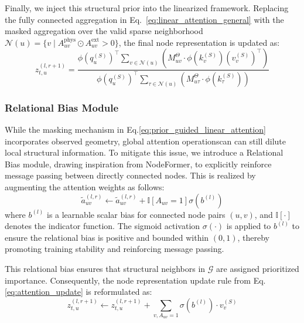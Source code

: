 \documentclass[5p,times,authoryear]{elsarticle}
\begin{document}
Finally, we inject this structural prior into the linearized framework. Replacing the fully connected aggregation in Eq.~\eqref{eq:linear_attention_general} with the masked aggregation over the valid sparse neighborhood $\mathcal{N}(u) = \{v \mid A^{\text{phys}}_{uv} \odot A^{\text{ext}}_{uv} > 0\}$, the final node representation is updated as:
\vspace{-3pt}
\begin{equation}
\label{eq:prior_guided_linear_attention}
z_{t,u}^{(l, r+1)} = \frac{\phi(q_u^{(S)})^\top \sum_{v \in \mathcal{N}(u)} \left( M_{uv}^{\Theta} \cdot \phi(k_v^{(S)}) (v_v^{(S)})^\top \right)}{\phi(q_u^{(S)})^\top \sum_{\tau \in \mathcal{N}(u)} \left( M_{u\tau}^{\Theta} \cdot \phi(k_\tau^{(S)}) \right)}
\end{equation}

\subsubsection{Relational Bias Module}
While the masking mechanism in Eq.\eqref{eq:prior_guided_linear_attention} incorporates observed geometry, global attention operationscan can still dilute local structural information. To mitigate this issue, we introduce a Relational Bias module, drawing inspiration from NodeFormer\citep{wu2023nodeformer}, to explicitly reinforce message passing between directly connected nodes. This is realized by augmenting the attention weights as follows:
\begin{equation}
\label{eq:relational_bias_attention}
\tilde{a}_{uv}^{(l,r)} \leftarrow \tilde{a}_{uv}^{(l,r)} + \mathbb{I}[A_{uv}=1]\sigma(b^{(l)})
\end{equation}
where $b^{(l)}$ is a learnable scalar bias for connected node pairs $(u,v)$, and $\mathbb{I}[\cdot]$ denotes the indicator function. The sigmoid activation $\sigma(\cdot)$ is applied to $b^{(l)}$ to ensure the relational bias is positive and bounded within $(0, 1)$, thereby promoting training stability and reinforcing message passing.

This relational bias ensures that structural neighbors in $\mathcal{G}$ are assigned prioritized importance. Consequently, the node representation update rule from Eq.\eqref{eq:attention_update} is reformulated as:
\vspace{-3pt}
\begin{equation}
\label{eq:relational_bias_update}
z_{t,u}^{(l, r+1)} \leftarrow z_{t,u}^{(l, r+1)} + \sum_{v, A_{uv}=1} \sigma(b^{(l)}) \cdot v_v^{(S)}
\end{equation}
\vspace{-3pt}
\end{document}
